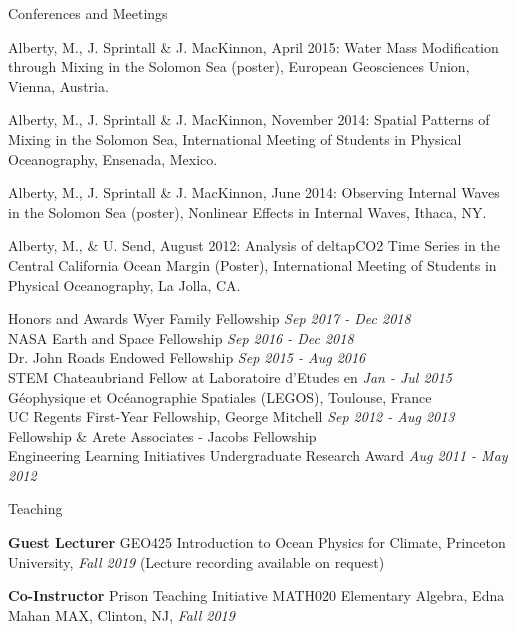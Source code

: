 \documentclass{resume} %
\begin{document}
\begin{rSection}{Conferences and Meetings}
\item Alberty, M., J. Sprintall \& J. MacKinnon, April 2015: Water Mass Modification through Mixing in the Solomon Sea (poster), European Geosciences Union, Vienna, Austria.
\item Alberty, M., J. Sprintall \& J. MacKinnon, November 2014: Spatial Patterns of Mixing in the Solomon Sea, International Meeting of Students in Physical Oceanography, Ensenada, Mexico.
\item Alberty, M., J. Sprintall \& J. MacKinnon, June 2014: Observing Internal Waves in the Solomon Sea (poster), Nonlinear Effects in Internal Waves, Ithaca, NY.
\item Alberty, M., \& U. Send, August 2012: Analysis of deltapCO2 Time Series in the Central California Ocean Margin (Poster), International Meeting of Students in Physical Oceanography, La Jolla, CA. 
\end{rSection}

\begin{rSection}{Honors and Awards}
Wyer Family Fellowship \hfill {\em Sep 2017 - Dec 2018} \\
NASA Earth and Space Fellowship \hfill {\em Sep 2016 - Dec 2018} \\
Dr. John Roads Endowed Fellowship \hfill {\em Sep 2015 - Aug 2016} \\
STEM Chateaubriand Fellow at Laboratoire d’Etudes en \hfill {\em Jan - Jul 2015} \\
G\'eophysique et Oc\'eanographie Spatiales (LEGOS), Toulouse, France \\
UC Regents First-Year Fellowship, George Mitchell \hfill {\em Sep 2012 - Aug 2013} \\
Fellowship \& Arete Associates - Jacobs Fellowship \\
Engineering Learning Initiatives Undergraduate Research Award \hfill {\em Aug 2011 - May 2012}
\end{rSection}

\begin{rSection}{Teaching}
\item {\bf Guest Lecturer} GEO425 Introduction to Ocean Physics for Climate, Princeton University, {\em Fall 2019} (Lecture recording available on request)
\item {\bf Co-Instructor} Prison Teaching Initiative MATH020 Elementary Algebra, Edna Mahan MAX, Clinton, NJ, {\em Fall 2019}
\end{rSection}
\end{document}
